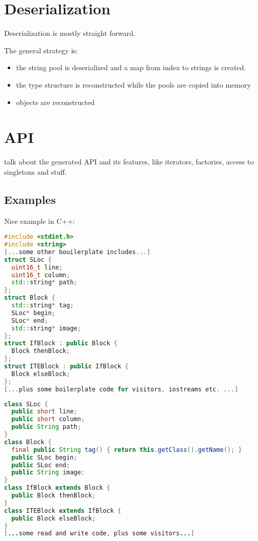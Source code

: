 \documentclass[a4paper,10pt]{article}
\begin{document}
\section{Deserialization}

Deserialization is mostly straight forward.

The general strategy is:
\begin{itemize}
 \item the string pool is deserialized and a map from index to strings is created.
 \item the type structure is reconstructed while the pools are copied into memory
 \item objects are reconstructed
\end{itemize}


\section{API}

talk about the generated API and its features, like iterators, factories, access to singletons and stuff.

\subsection{Examples}

Nice example in C++:
\begin{lstlisting}[label=cppExample,caption=C++ Examples,language=C++]
#include <stdint.h>
#include <string>
[...some other bouilerplate includes...]
struct SLoc {
  uint16_t line;
  uint16_t column;
  std::string* path;
};
struct Block {
  std::string* tag;
  SLoc* begin;
  SLoc* end;
  std::string* image;
};
struct IfBlock : public Block {
  Block thenBlock;
};
struct ITEBlock : public IfBlock {
  Block elseBlock;
};
[...plus some boilerplate code for visitors, iostreams etc. ...]
\end{lstlisting}

\begin{lstlisting}[label=javaExample,caption=Java Examples,language=Java]
class SLoc {
  public short line;
  public short column;
  public String path;
}
class Block {
  final public String tag() { return this.getClass().getName(); }
  public SLoc begin;
  public SLoc end;
  public String image:
}
class IfBlock extends Block {
  public Block thenBlock;
}
class ITEBlock extends IfBlock {
  public Block elseBlock;
}
[...some read and write code, plus some visitors...]
\end{lstlisting}
\end{document}
